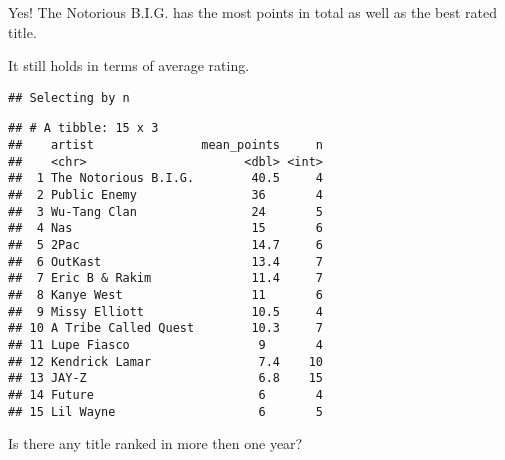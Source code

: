 \documentclass[
]{article}
\newenvironment{Shaded}{\begin{snugshade}}{\end{snugshade}}
\newcommand{\DataTypeTok}[1]{\textcolor[rgb]{0.13,0.29,0.53}{#1}}
\newcommand{\DecValTok}[1]{\textcolor[rgb]{0.00,0.00,0.81}{#1}}
\newcommand{\KeywordTok}[1]{\textcolor[rgb]{0.13,0.29,0.53}{\textbf{#1}}}
\newcommand{\NormalTok}[1]{#1}
\newcommand{\OperatorTok}[1]{\textcolor[rgb]{0.81,0.36,0.00}{\textbf{#1}}}
\newcommand{\OtherTok}[1]{\textcolor[rgb]{0.56,0.35,0.01}{#1}}
\newcommand{\StringTok}[1]{\textcolor[rgb]{0.31,0.60,0.02}{#1}}
\begin{document}
Yes! The Notorious B.I.G. has the most points in total as well as the
best rated title.

It still holds in terms of average rating.

\begin{Shaded}
\end{Shaded}

\begin{verbatim}
## Selecting by n
\end{verbatim}

\begin{verbatim}
## # A tibble: 15 x 3
##    artist               mean_points     n
##    <chr>                      <dbl> <int>
##  1 The Notorious B.I.G.        40.5     4
##  2 Public Enemy                36       4
##  3 Wu-Tang Clan                24       5
##  4 Nas                         15       6
##  5 2Pac                        14.7     6
##  6 OutKast                     13.4     7
##  7 Eric B & Rakim              11.4     7
##  8 Kanye West                  11       6
##  9 Missy Elliott               10.5     4
## 10 A Tribe Called Quest        10.3     7
## 11 Lupe Fiasco                  9       4
## 12 Kendrick Lamar               7.4    10
## 13 JAY-Z                        6.8    15
## 14 Future                       6       4
## 15 Lil Wayne                    6       5
\end{verbatim}

Is there any title ranked in more then one year?

\begin{Shaded}
\end{Shaded}
\end{document}
